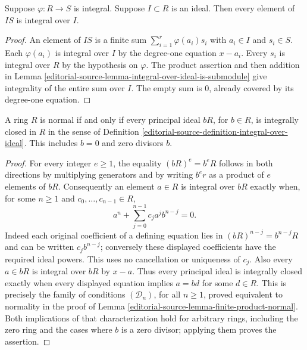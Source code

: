 \begin{lemma}
\label{editorial-source-lemma-integral-integral-over-ideal}
Suppose $\varphi : R \to S$ is integral.
Suppose $I \subset R$ is an ideal.
Then every element of $IS$ is integral over $I$.
\end{lemma}

\begin{proof}
An element of $IS$ is a finite sum
$\sum_{i=1}^r\varphi(a_i)s_i$ with $a_i\in I$ and $s_i\in S$.
Each $\varphi(a_i)$ is integral over $I$ by the degree-one
equation $x-a_i$. Every $s_i$ is integral over $R$ by the
hypothesis on $\varphi$. The product assertion and then addition
in Lemma \ref{editorial-source-lemma-integral-over-ideal-is-submodule} give
integrality of the entire sum over $I$. The empty sum is $0$,
already covered by its degree-one equation.
\end{proof}

\begin{lemma}
\label{editorial-source-lemma-normal-principal-ideals-integrally-closed}
A ring $R$ is normal if and only if every principal ideal
$bR$, for $b\in R$, is integrally closed in $R$ in the sense
of Definition \ref{editorial-source-definition-integral-over-ideal}.
This includes $b=0$ and zero divisors $b$.
\end{lemma}

\begin{proof}
For every integer $e\geq1$, the equality $(bR)^e=b^eR$
follows in both directions by multiplying generators and by
writing $b^er$ as a product of $e$ elements of $bR$.
Consequently an element $a\in R$ is integral over $bR$ exactly
when, for some $n\geq1$ and $c_0,\ldots,c_{n-1}\in R$,
$$
a^n+\sum_{j=0}^{n-1}c_ja^jb^{n-j}=0.
$$
Indeed each original coefficient of a defining equation lies in
$(bR)^{n-j}=b^{n-j}R$ and can be written $c_jb^{n-j}$;
conversely these displayed coefficients have the required ideal
powers. This uses no cancellation or uniqueness of $c_j$.
Also every $a\in bR$ is integral over $bR$ by $x-a$.
Thus every principal ideal is integrally closed exactly when
every displayed equation implies $a=bd$ for some $d\in R$.
This is precisely the family of conditions $(\mathcal D_n)$,
for all $n\geq1$, proved equivalent to normality in the proof of
Lemma \ref{editorial-source-lemma-finite-product-normal}. Both implications of
that characterization hold for arbitrary rings, including the
zero ring and the cases where $b$ is a zero divisor; applying
them proves the assertion.
\end{proof}